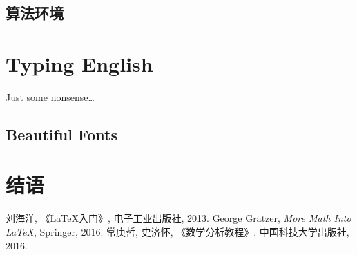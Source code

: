 \documentclass[UTF8,a4paper,twoside,zihao=-4]{ctexrep}
\theoremstyle{nonumberplain}
\begin{document}
\section{算法环境}

\chapter{Typing English}
Just some nonsense\dots
\section{Beautiful Fonts}
\lipsum

\chapter{结语}
\begin{thebibliography}{99}
	刘海洋, 《\LaTeX 入门》, 电子工业出版社, 2013.
	George Gr\"{a}tzer, \emph{More Math Into \LaTeX}, Springer, 2016.
常庚哲, 史济怀, 《数学分析教程》, 中国科技大学出版社, 2016.
\end{thebibliography}
\end{document}
